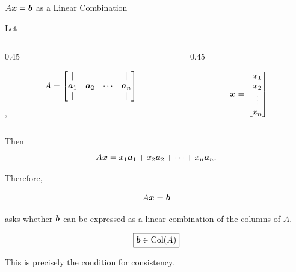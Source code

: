 \begin{frame}{$A\bm{x}=\bm{b}$ as a Linear Combination}

Let
\vspace{-1.9cm}
\begin{columns}[c,totalwidth=\textwidth]

\begin{column}{0.45\textwidth}

\begin{center}

\[
A=
\begin{bmatrix}
|&|& &|\\
\bm{a}_1&\bm{a}_2&\cdots&\bm{a}_n\\
|&|& &|
\end{bmatrix}
\],

\end{center}

\end{column}

\begin{column}{0.45\textwidth}

\begin{center}

\[
\bm{x}
=
\begin{bmatrix}
x_1\\
x_2\\
\vdots\\
x_n
\end{bmatrix}
\]

\end{center}

\end{column}

\end{columns}

\vspace{0.1cm}

Then
\vspace{-0.1cm}
\[
A\bm{x}
=
x_1\bm{a}_1+
x_2\bm{a}_2+
\cdots+
x_n\bm{a}_n.
\]

Therefore,

\[
A\bm{x}=\bm{b}
\]

asks whether $\bm{b}$ can be expressed as a linear
combination of the columns of $A$.

\vspace{-0.1cm}

\begin{center}

\[
\boxed{
\bm{b}\in\operatorname{Col}(A)
}
\]

\end{center}

This is precisely the condition for consistency.

\end{frame}


